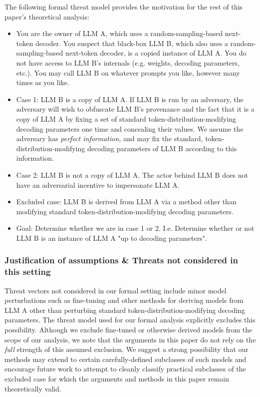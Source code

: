 \documentclass{article}
\begin{document}
The following formal threat model provides the motivation for the rest of this paper's theoretical analysis:
\begin{itemize}
\item You are the owner of LLM A, which uses a random-sampling-based next-token decoder. You suspect that black-box LLM B, which also uses a random-sampling-based next-token decoder, is a copied instance of LLM A. You do not have access to LLM B's internals (e.g. weights, decoding parameters, etc.). You may call LLM B on whatever prompts you like, however many times as you like.
\item Case 1: LLM B is a copy of LLM A. If LLM B is run by an adversary, the adversary will wish to obfuscate LLM B's provenance and the fact that it is a copy of LLM A by fixing a set of standard token-distribution-modifying decoding parameters one time and concealing their values. We assume the adversary has \textit{perfect information,} and may fix the standard, token-distribution-modifying decoding parameters of LLM B according to this information.
\item Case 2: LLM B is not a copy of LLM A. The actor behind LLM B does not have an adversarial incentive to impersonate LLM A.
\item Excluded case: LLM B is derived from LLM A via a method other than modifying standard token-distribution-modifying decoding parameters.
\item Goal: Determine whether we are in case 1 or 2. I.e. Determine whether or not LLM B is an instance of LLM A "up to decoding parameters".
\end{itemize}



\subsubsection{Justification of assumptions \& Threats not considered in this setting}

Threat vectors not considered in our formal setting include minor model perturbations such as fine-tuning and other methods for deriving models from LLM A other than perturbing standard token-distribution-modifying decoding parameters. The threat model used for our formal analysis explicitly excludes this possibility. Although we exclude fine-tuned or otherwise derived models from the scope of our analysis, we note that the arguments in this paper do not rely on the \textit{full} strength of this assumed exclusion. We suggest a strong possibility that our methods may extend to certain carefully-defined subclasses of such models and encourage future work to attempt to cleanly classify practical subclasses of the excluded case for which the arguments and methods in this paper remain theoretically valid.
\end{document}
